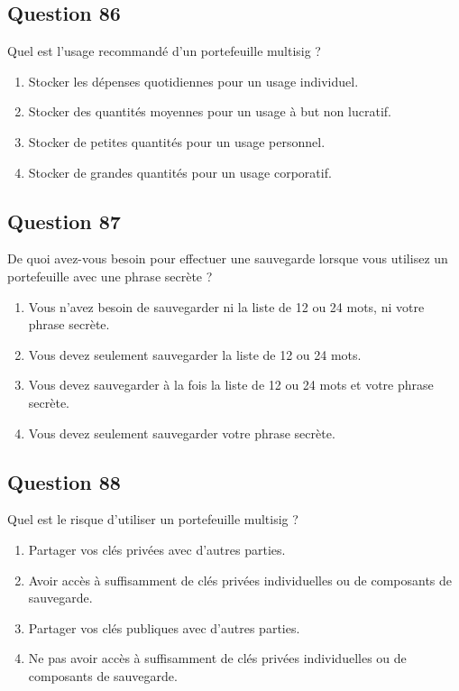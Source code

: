 \documentclass[12pt,a4paper]{article}
\begin{document}
\bigskip


\subsection*{Question 86}
Quel est l'usage recommandé d'un portefeuille multisig ?

\begin{enumerate}[label=\Alph*., leftmargin=*]
\item Stocker les dépenses quotidiennes pour un usage individuel.
\item Stocker des quantités moyennes pour un usage à but non lucratif.
\item Stocker de petites quantités pour un usage personnel.
\item Stocker de grandes quantités pour un usage corporatif.
\end{enumerate}

\bigskip


\subsection*{Question 87}
De quoi avez-vous besoin pour effectuer une sauvegarde lorsque vous utilisez un portefeuille avec une phrase secrète ?

\begin{enumerate}[label=\Alph*., leftmargin=*]
\item Vous n'avez besoin de sauvegarder ni la liste de 12 ou 24 mots, ni votre phrase secrète.
\item Vous devez seulement sauvegarder la liste de 12 ou 24 mots.
\item Vous devez sauvegarder à la fois la liste de 12 ou 24 mots et votre phrase secrète.
\item Vous devez seulement sauvegarder votre phrase secrète.
\end{enumerate}

\bigskip


\subsection*{Question 88}
Quel est le risque d'utiliser un portefeuille multisig ?

\begin{enumerate}[label=\Alph*., leftmargin=*]
\item Partager vos clés privées avec d'autres parties.
\item Avoir accès à suffisamment de clés privées individuelles ou de composants de sauvegarde.
\item Partager vos clés publiques avec d'autres parties.
\item Ne pas avoir accès à suffisamment de clés privées individuelles ou de composants de sauvegarde.
\end{enumerate}
\end{document}
